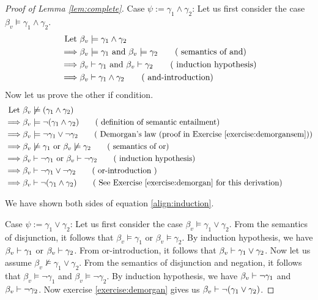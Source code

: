 \begin{proof} [Proof of Lemma \ref{lem:complete}]
Case $\psi := \gamma_1 \wedge \gamma_2$: Let us first consider the case $\beta_v \models \gamma_1 \wedge \gamma_2$. 
\begin{align*}
\text{Let } & \beta_v \models \gamma_1 \wedge \gamma_2 
\\ \implies & \beta_v \models \gamma_1 \text{ and } \beta_v \models \gamma_2  \tag{ semantics of and}
\\ \implies & \beta_v \vdash \gamma_1 \text { and } \beta_v \vdash \gamma_2  \tag{ induction hypothesis}
\\ \implies & \beta_v \vdash \gamma_1 \wedge \gamma_2  \tag{ and-introduction}	
\end{align*}
Now let us prove the other if condition.
\begin{align*}
\text{Let } & \beta_v \nmodels (\gamma_1 \wedge \gamma_2) 
\\ \implies & \beta_v \models \neg (\gamma_1 \wedge \gamma_2) \tag{ definition of semantic entailment}
\\ \implies & \beta_v \models \neg \gamma_1 \vee \neg \gamma_2 \tag { Demorgan's law (proof in Exercise \ref{exercise:demorgansem})}
\\ \implies & \beta_v \nmodels  \gamma_1 \text{ or } \beta_v \nmodels  \gamma_2 \tag { semantics of or}
\\ \implies & \beta_v \proves \neg \gamma_1 \text { or } \beta_v \proves \neg \gamma_2 \tag { induction hypothesis}
\\ \implies & \beta_v \proves \neg \gamma_1 \vee \neg \gamma_2 \tag { or-introduction }
\\ \implies & \beta_v \proves \neg (\gamma_1 \wedge \gamma_2) \tag{ See Exercise \ref{exercise:demorgan} for this derivation}
\end{align*}

We have shown both sides of equation \ref{align:induction}. 

Case $\psi := \gamma_1 \vee \gamma_2$:  Let us first consider the case $\beta_v \models \gamma_1 \vee \gamma_2$. From the semantics of disjunction, it follows that $\beta_v \models \gamma_1$ or $\beta_v \models \gamma_2$. By induction hypothesis, we have $\beta_v \vdash \gamma_1$ or $\beta_v \vdash \gamma_2$. From or-introduction, it follows that $\beta_v \vdash \gamma_1\vee\gamma_2$. Now let us assume $\beta_v \not \models \gamma_1 \vee \gamma_2$. From the semantics of disjunction and negation, it follows that $\beta_v \models \neg \gamma_1$ and $\beta_v  \models \neg \gamma_2$. By induction hypothesis, we have $\beta_v \vdash \neg \gamma_1$ and $\beta_v  \vdash \neg \gamma_2$. Now exercise \ref{exercise:demorgan} gives us $\beta_v \vdash \neg (\gamma_1\vee \gamma_2)$.


\end{proof}
